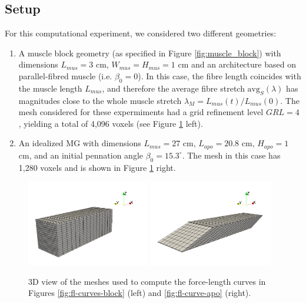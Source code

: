 \documentclass{sfuthesis}
\numberwithin{equation}{section}
\numberwithin{figure}{chapter}
\numberwithin{table}{chapter}
\theoremstyle{definition}
\begin{document}
\subsection{Setup} \label{sec:flexodeal-fl-curve-setup}

For this computational experiment, we considered two different geometries:

\begin{enumerate}
    \item A muscle block geometry (as specified in Figure \ref{fig:muscle_block}) with dimensions $L_{mus} = 3$ cm, $W_{mus} = H_{mus} = 1$ cm and an architecture based on parallel-fibred muscle (i.e. $\beta_0 = 0$). In this case, the fibre length coincides with the muscle length $L_{mus}$, and therefore the average fibre stretch $\mathrm{avg}_S(\lambda)$ has magnitudes close to the whole muscle stretch $\lambda_M= L_{mus}(t)/L_{mus}(0)$. The mesh considered for these expermiments had a grid refinement level $GRL=4$, yielding a total of 4,096 voxels (see Figure \ref{fig:fl_meshes} left).
    \item An idealized MG with dimensions $L_{mus} = 27$ cm, $L_{apo} = 20.8$ cm, $H_{apo} = 1$ cm, and an initial pennation angle $\beta_0 = 15.3^\circ$. The mesh in this case has 1,280 voxels and is shown in Figure \ref{fig:fl_meshes} right.
\end{enumerate}

\begin{figure}
    \centering
    \includegraphics[width=0.48\textwidth]{fl_mesh_muscle_block.png}
    \includegraphics[width=0.48\textwidth]{fl_mesh_idealized_mg.png}\
    \caption{3D view of the meshes used to compute the force-length curves in Figures \ref{fig:fl-curves-block} (left) and \ref{fig:fl-curve-apo} (right).
    \label{fig:fl_meshes}}
\end{figure}
\end{document}
